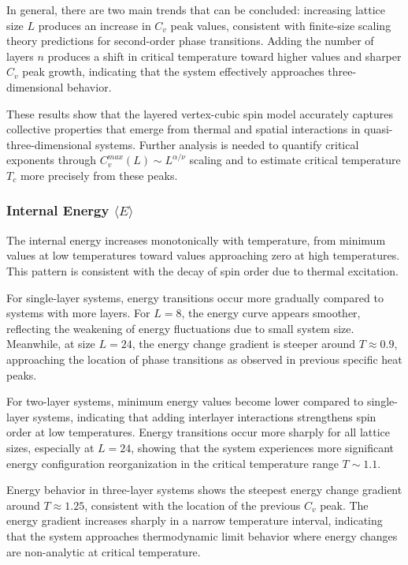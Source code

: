 In general, there are two main trends that can be concluded: increasing lattice size $L$ produces an increase in $C_v$ peak values, consistent with finite-size scaling theory predictions for second-order phase transitions. Adding the number of layers $n$ produces a shift in critical temperature toward higher values and sharper $C_v$ peak growth, indicating that the system effectively approaches three-dimensional behavior.

These results show that the layered vertex-cubic spin model accurately captures collective properties that emerge from thermal and spatial interactions in quasi-three-dimensional systems. Further analysis is needed to quantify critical exponents through $C_v^{max}(L) \sim L^{\alpha/\nu}$ scaling and to estimate critical temperature $T_c$ more precisely from these peaks.

\subsubsection{Internal Energy $\langle E \rangle$}

The internal energy increases monotonically with temperature, from minimum values at low temperatures toward values approaching zero at high temperatures. This pattern is consistent with the decay of spin order due to thermal excitation.

For single-layer systems, energy transitions occur more gradually compared to systems with more layers. For $L = 8$, the energy curve appears smoother, reflecting the weakening of energy fluctuations due to small system size. Meanwhile, at size $L = 24$, the energy change gradient is steeper around $T \approx 0.9$, approaching the location of phase transitions as observed in previous specific heat peaks.

For two-layer systems, minimum energy values become lower compared to single-layer systems, indicating that adding interlayer interactions strengthens spin order at low temperatures. Energy transitions occur more sharply for all lattice sizes, especially at $L = 24$, showing that the system experiences more significant energy configuration reorganization in the critical temperature range $T \sim 1.1$.

Energy behavior in three-layer systems shows the steepest energy change gradient around $T \approx 1.25$, consistent with the location of the previous $C_v$ peak. The energy gradient increases sharply in a narrow temperature interval, indicating that the system approaches thermodynamic limit behavior where energy changes are non-analytic at critical temperature.

